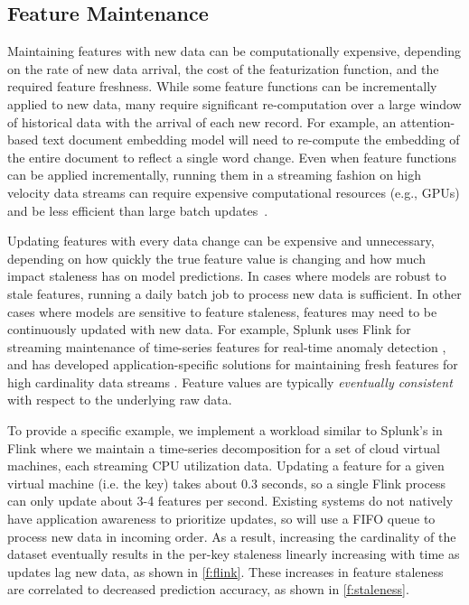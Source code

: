 \subsection{Feature Maintenance}
Maintaining features with new data can be computationally expensive, depending on the rate of new data arrival, the cost of the featurization function, and the required feature freshness.  While some feature functions can be incrementally applied to new data, many require significant re-computation over a large window of historical data with the arrival of each new record.   
For example, an attention-based text document embedding model will need to re-compute the embedding of the entire document to reflect a single word change. 
Even when feature functions can be applied incrementally, running them in a streaming fashion on high velocity data streams can require expensive computational resources (e.g., GPUs) and be less efficient than large batch updates~\cite{clipper, crankshaw2020inferline}. 


Updating features with every data change can be expensive and unnecessary, depending on how quickly the true feature value is changing and how much impact staleness has on model predictions. In cases where models are robust to stale features, running a daily batch job to process new data is sufficient. In other cases where models are sensitive to feature staleness, features may need to be continuously updated with new data. For example, Splunk uses Flink for streaming maintenance of time-series features for real-time anomaly detection \cite{mishra2021onlinestl}, and has developed application-specific solutions for maintaining fresh features for high cardinality data streams \cite{mishra2021onlinestl}. 
Feature values are typically \textit{eventually consistent} with respect to the underlying raw data.



To provide a specific example, we implement a workload similar to Splunk's in Flink where we maintain a time-series decomposition for a set of cloud virtual machines, each streaming CPU utilization data. Updating a feature for a given virtual machine (i.e. the key) takes about 0.3 seconds, so a single Flink process can only update about 3-4 features per second. Existing systems do not natively have application awareness to prioritize updates, so will use a FIFO queue to process new data in incoming order. As a result, increasing the cardinality of the dataset eventually results in the per-key staleness linearly increasing with time as updates 
lag
new data, as shown in \cref{f:flink}. These increases in feature staleness are correlated to decreased prediction accuracy, as shown in \cref{f:staleness}.

